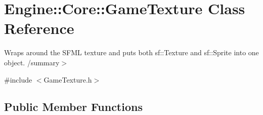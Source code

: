\hypertarget{class_engine_1_1_core_1_1_game_texture}{}\section{Engine\+:\+:Core\+:\+:Game\+Texture Class Reference}
\label{class_engine_1_1_core_1_1_game_texture}


Wraps around the S\+F\+ML texture and puts both sf\+::\+Texture and sf\+::\+Sprite into one object. /summary$>$  




{\ttfamily \#include $<$Game\+Texture.\+h$>$}

\subsection*{Public Member Functions}
